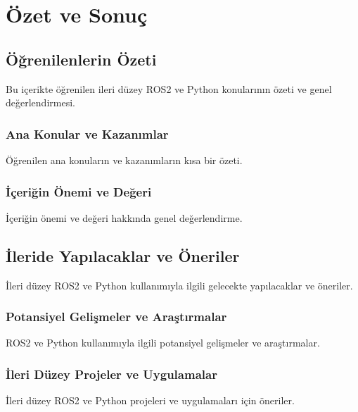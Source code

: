 \chapter{Özet ve Sonuç}

\section{Öğrenilenlerin Özeti}
Bu içerikte öğrenilen ileri düzey ROS2 ve Python konularının özeti ve genel değerlendirmesi.

\subsection{Ana Konular ve Kazanımlar}
Öğrenilen ana konuların ve kazanımların kısa bir özeti.

\subsection{İçeriğin Önemi ve Değeri}
İçeriğin önemi ve değeri hakkında genel değerlendirme.

\section{İleride Yapılacaklar ve Öneriler}
İleri düzey ROS2 ve Python kullanımıyla ilgili gelecekte yapılacaklar ve öneriler.

\subsection{Potansiyel Gelişmeler ve Araştırmalar}
ROS2 ve Python kullanımıyla ilgili potansiyel gelişmeler ve araştırmalar.

\subsection{İleri Düzey Projeler ve Uygulamalar}
İleri düzey ROS2 ve Python projeleri ve uygulamaları için öneriler.
